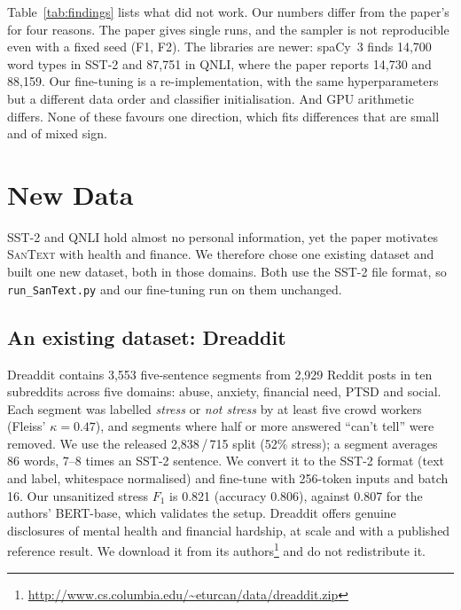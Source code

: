 \documentclass[11pt]{article}
\newcommand{\santext}{\textsc{SanText}}
\begin{document}
Table~\ref{tab:findings} lists what did not work. Our numbers differ from the paper's for four reasons. The paper gives single runs, and the sampler is not reproducible even with a fixed seed (F1, F2). The libraries are newer: spaCy~3 finds 14,700 word types in SST-2 and 87,751 in QNLI, where the paper reports 14,730 and 88,159. Our fine-tuning is a re-implementation, with the same hyperparameters but a different data order and classifier initialisation. And GPU arithmetic differs. None of these favours one direction, which fits differences that are small and of mixed sign.

\section{New Data}
\label{sec:newdata}
SST-2 and QNLI hold almost no personal information, yet the paper motivates \santext{} with health and finance. We therefore chose one existing dataset and built one new dataset, both in those domains. Both use the SST-2 file format, so \texttt{run\_SanText.py} and our fine-tuning run on them unchanged.

\subsection{An existing dataset: Dreaddit}
Dreaddit \citep{turcan-mckeown-2019-dreaddit} contains 3,553 five-sentence segments from 2,929 Reddit posts in ten subreddits across five domains: abuse, anxiety, financial need, PTSD and social. Each segment was labelled \emph{stress} or \emph{not stress} by at least five crowd workers (Fleiss' $\kappa = 0.47$), and segments where half or more answered ``can't tell'' were removed. We use the released 2,838\,/\,715 split (52\% stress); a segment averages 86 words, 7--8 times an SST-2 sentence. We convert it to the SST-2 format (text and label, whitespace normalised) and fine-tune with 256-token inputs and batch 16. Our unsanitized stress $F_1$ is 0.821 (accuracy 0.806), against 0.807 for the authors' BERT-base, which validates the setup. Dreaddit offers genuine disclosures of mental health and financial hardship, at scale and with a published reference result. We download it from its authors\footnote{\url{http://www.cs.columbia.edu/~eturcan/data/dreaddit.zip}} and do not redistribute it.
\end{document}
